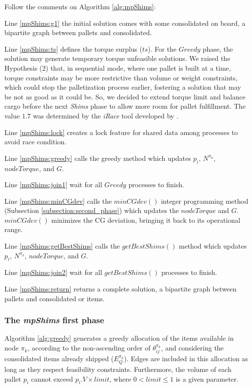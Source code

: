 \documentclass[preprint,authoryear]{elsarticle}
\begin{document}
Follow the comments on Algorithm \ref{alg:mpShims}:

Line \ref{mpShims:g1} the initial solution comes with some consolidated on board, a bipartite graph between pallets and consolidated.

Line \ref{mpShims:ts} defines the torque surplus ($ts$). For the $Greedy$ phase, the solution may generate temporary torque unfeasible solutions. We raised the Hypothesis (2) that, in sequential mode, where one pallet is built at a time, torque constraints may be more restrictive than volume or weight constraints, which could stop the palletization process earlier, fostering a solution that may be not as good as it could be. So, we decided to extend torque limit and balance cargo before the next {\it Shims} phase to allow more room for pallet fulfillment. The value $1.7$ was determined by the {\it iRace} tool developed by \cite{LopezIbanezManuel2016}.

Line \ref{mpShims:lock} creates a lock feature for shared data among processes to avoid race condition.

Line \ref{mpShims:greedy} calls the greedy method which updates $p_i$, $N^{\pi_k}$, $nodeTorque$, and $G$.

Line \ref{mpShims:join1} wait for all $Greedy$ processes to finish.

Line \ref{mpShims:minCGdev} calls the $minCGdev()$ integer programming method (Subsection \ref{subsection:second_phase}) which updates the $nodeTorque$ and $G$. $minCGdev()$ minimizes the CG deviation, bringing it back to its operational range. 

Line \ref{mpShims:getBestShims} calls the $getBestShims()$ method which updates $p_i$, $N^{\pi_k}$, $nodeTorque$, and $G$.

Line \ref{mpShims:join2} wait for all $getBestShims()$ processes to finish.

Line \ref{mpShims:return} returns a complete solution, a bipartite graph between pallets and consolidated or items.


\subsubsection{The {\it mpShims} first phase}


Algorithm \ref{alg:greedy} generates a greedy allocation of the items available in node ${\pi_k}$, according to the non-ascending order of $\theta^{\pi_k}_{ij}$, and considering the consolidated items already shipped ($E_Q^{\pi_k}$). Edges are included in this allocation as long as they respect feasibility constraints. Furthermore, the volume of each pallet $p_i$\/ cannot exceed $p_i.V \times limit$, where $ 0 < limit \leq 1$\/ is a given parameter.
\end{document}
